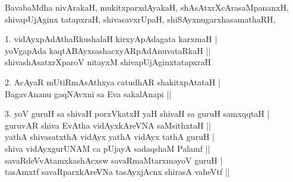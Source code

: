 \begin{entry}
\medskip

\begin{shl}
BavabaMdha nivArakaH, mukitxparxdAyakaH, shAsAtxrXcArasaMpananxH,\\[1pt]
shivapUjAginx tatapxraH, shivasavxrUpaH, shiSAyxnugarxhasamathaRH,
\end{shl}
\smallskip
\begin{shl}
1. vidAyxpAdAthaRkushalaH kirxyApAdagata karxmaH |\\[1pt]
yoVgapAda kaqtABAyxsashacxyARpAdAnuvataRkaH ||\\[1pt]
shivashAsatxrXparoV nitayxM shivapUjAginxtatapxraH
\end{shl}
\smallskip
\begin{shl}
2. AcAyaR mUtiRmAsAthxya catudhAR shakitxpAtataH |\\[1pt]
BagavAnanu gaqNAvxni sa Eva sakalAnapi ||
\end{shl}
\smallskip
\begin{shl}
3. yoV guruH sa shivaH porxVkatxH yaH shivaH sa guruH samxqqtaH |\\[1pt]
guruvAR shiva EvAtha vidAyxkAreVNA saMsithxtaH ||\\[1pt]
yathA shivasatxthA vidAyx yathA vidAyx tathA guruH |\\[1pt]
shiva vidAyxgurUNAM ca pUjayA sadaqshaM Palamf ||\\[1pt]
savaRdeVvAtamxkashAcxsw savaRmaMtarxmayoV guruH |\\[1pt]
tasAmxtf savaRparxkAreVNa tasAyxjAcnx shirasA vaheVtf ||
\end{shl}
\smallskip
{}
\end{entry}


